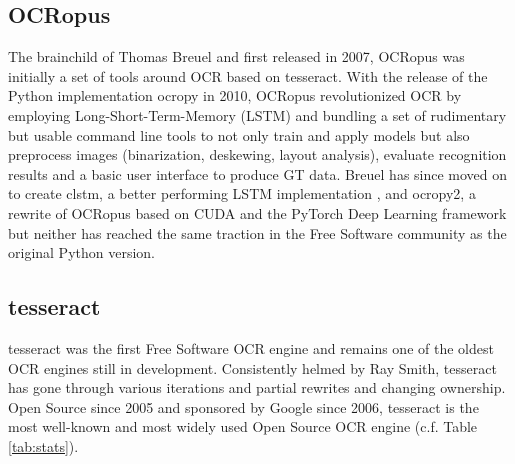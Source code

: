 \documentclass[conference]{IEEEtran}
\begin{document}
\subsection*{OCRopus}

The brainchild of Thomas Breuel and first released in 2007, OCRopus
\cite{breuel} was initially a set of tools around OCR based on
tesseract. With the release of the Python implementation ocropy in
2010, OCRopus revolutionized OCR by employing
Long-Short-Term-Memory (LSTM) and bundling a set of rudimentary but
usable command line tools to not only train and apply models but
also preprocess images (binarization, deskewing, layout analysis),
evaluate recognition results and a basic user interface to produce
GT data. Breuel has since moved on to create clstm, a better
performing LSTM implementation \cite{DBLP:conf/icdar/Breuel17}, and
ocropy2, a rewrite of OCRopus based on CUDA and the PyTorch Deep
Learning framework \cite{DBLP:conf/icdar/Breuel17} but neither has
reached the same traction in the Free Software community as the
original Python version.


\subsection*{tesseract}

tesseract \cite{4376991} was the first Free Software OCR engine and remains one of
the oldest OCR engines still in development. Consistently helmed by Ray Smith,
tesseract has gone through various iterations and partial rewrites and changing
ownership. Open Source since 2005 and sponsored by Google since 2006, tesseract
is the most well-known and most widely used Open Source OCR engine
(c.f. Table \ref{tab:stats}).
\end{document}
